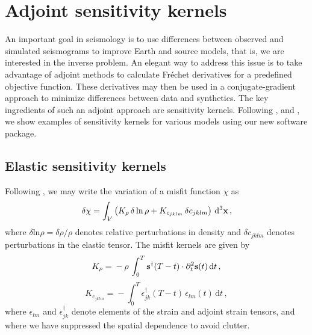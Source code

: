 \documentclass[referee,extra]{gji}
\newcommand{\bequ}{\begin{equation} }
\newcommand{\eequ}{\end{equation} }
\newcommand{\bs}{ {\bf s } }
\newcommand{\bx}{ {\bf x } }
\renewcommand{\cite}[1]{\citet{#1}}
\begin{document}
\section{Adjoint sensitivity kernels}\label{sec:adjointkernels}

An important goal in seismology is to use differences between observed and simulated seismograms
to improve Earth and source models, that is, we are interested in the inverse problem.
An elegant way to address this issue is to take advantage of adjoint methods \citep{Tar84,TrTaLi05}
to calculate Fr\'echet derivatives for a predefined objective function.
These derivatives may then be used in a conjugate-gradient approach to minimize differences
between data and synthetics.
The key ingredients of such an adjoint approach are sensitivity kernels.
Following \cite{TrTaLi05}, \cite{LiTr06,LiTr08} and \cite{trompetal2010},
we show examples of sensitivity kernels for various models using our new software package.

\subsection{Elastic sensitivity kernels}\label{subsec:elastickernels}

Following \cite{TrTaLi05},
we may write the variation of a misfit function $\chi$ as
\bequ \label{equ:misfitperturbation}
\delta \chi = \int_V \left(K_\rho  \, \delta \ln \rho   + K_{c_{jklm}}\,   \delta c_{jklm}     \right) \,\mathrm{d}^3 \bx\,,
\eequ
where $\delta {\mathrm{ln}} \rho = \delta \rho / \rho$ denotes relative perturbations in density
and $\delta c_{jklm}  $ denotes perturbations in the elastic tensor.
The misfit kernels are given by
\bequ
K_\rho    = \mbox{}- \rho  \, \int_0^T \bs^{\dag} (  T-t ) \cdot \partial_t^2 \bs (t) \,\mathrm{d}t \,,
\eequ
\bequ
K_{c_{jklm}}   = \mbox{}- \int_0^T \epsilon_{jk}^\dag (  T-t ) \, \epsilon_{lm}( t ) \,\mathrm{d}t \,,
\eequ
where $\epsilon_{lm} $ and $\epsilon_{jk}^\dag $ denote elements of the strain and adjoint strain tensors,
and where we have suppressed the spatial dependence to avoid clutter.
\end{document}
